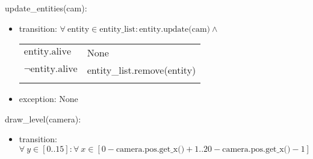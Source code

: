 \documentclass[12pt]{article}
\begin{document}
update\_entities(cam): 
\begin{itemize}
    \item transition: $\forall\ \text{entity} \in \text{entity\_list} : \text{entity.update(cam)} \land$\\
\begin{tabular}{|p{3cm}|l|}
\hhline{|-|-|}
$\mbox{entity.alive}$ & None\\
\hhline{|-|-|}
$\lnot \mbox{entity.alive}$ & entity\_list.remove(entity)\\
\hhline{|-|-|}
\end{tabular}
    \item exception: None
\end{itemize}

draw\_level(camera):
\begin{itemize}
    \item transition:
    $\forall\ y \in [0 .. 15] : \forall\ x \in [0 - \text{camera.pos.get\_x()} + 1 .. 20 - \text{camera.pos.get\_x()} -1]$\\
    


\end{itemize}
\end{document}
